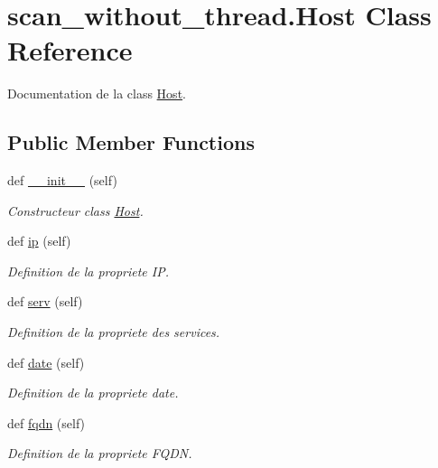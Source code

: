 \hypertarget{classscan__without__thread_1_1Host}{}\section{scan\+\_\+without\+\_\+thread.\+Host Class Reference}
\label{classscan__without__thread_1_1Host}


Documentation de la class \hyperlink{classscan__without__thread_1_1Host}{Host}.  


\subsection*{Public Member Functions}
\begin{DoxyCompactItemize}
\item 
def \hyperlink{classscan__without__thread_1_1Host_a35bd0879168bd31fdb6385c45c7ba901}{\+\_\+\+\_\+init\+\_\+\+\_\+} (self)
\begin{DoxyCompactList}\small\item\em Constructeur class \hyperlink{classscan__without__thread_1_1Host}{Host}. \end{DoxyCompactList}\item 
def \hyperlink{classscan__without__thread_1_1Host_a2480e26491f7315e7d9f214497c45944}{ip} (self)
\begin{DoxyCompactList}\small\item\em Definition de la propriete IP. \end{DoxyCompactList}\item 
def \hyperlink{classscan__without__thread_1_1Host_a58944abb503f140faf7feee5a4ade3bb}{serv} (self)
\begin{DoxyCompactList}\small\item\em Definition de la propriete des services. \end{DoxyCompactList}\item 
def \hyperlink{classscan__without__thread_1_1Host_a9780fad45e0730e7f897ede240b616a6}{date} (self)
\begin{DoxyCompactList}\small\item\em Definition de la propriete date. \end{DoxyCompactList}\item 
def \hyperlink{classscan__without__thread_1_1Host_af0c9f53c893137c3cc3e8cb2a4bf318c}{fqdn} (self)
\begin{DoxyCompactList}\small\item\em Definition de la propriete F\+Q\+DN. \end{DoxyCompactList}\item 

\end{DoxyCompactItemize}
